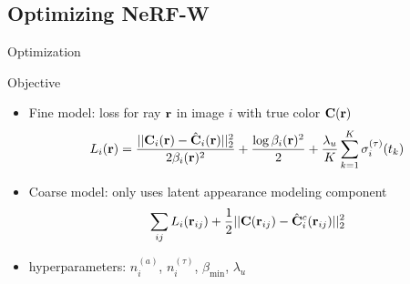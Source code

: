 \documentclass[aspectratio=1610,handout]{beamer}
\begin{document}
\subsection{Optimizing NeRF-W}
\begin{frame}{Optimization}
    \begin{block}{Objective}
        \begin{itemize}
            \item Fine model: loss for ray \(\vb{r}\) in image \(i\) with true color \(\vb{C}(\vb{r})\)
            \begin{equation*}
                L_i(\vb{r}) 
                = \frac{|| \vb{C}_i (\vb{r}) - \hat{\vb{C}}_i (\vb{r}) ||_2^2}{2\beta_i (\vb{r})^2} 
                + \frac{\log \beta_i (\vb{r})^2}{2} 
                + \frac{\lambda_u}{K} \sum^K_{k=1}\sigma_i^{(\tau)} (t_k)
            \end{equation*}
            \item Coarse model: only uses latent appearance modeling component
            \begin{equation*}
                \sum_{ij} L_i (\vb{r}_{ij}) + \frac{1}{2} || \vb{C} (\vb{r}_{ij}) - \hat{\vb{C}}_i^c (\vb{r}_{ij}) ||^2_2 
            \end{equation*}
            \item hyperparameters: \(n_i^{(a)}\), \(n_i^{(\tau)}\), \(\beta_{\textrm{min}}\), \(\lambda_u\)
        \end{itemize}
    \end{block}  
\end{frame}
\end{document}
